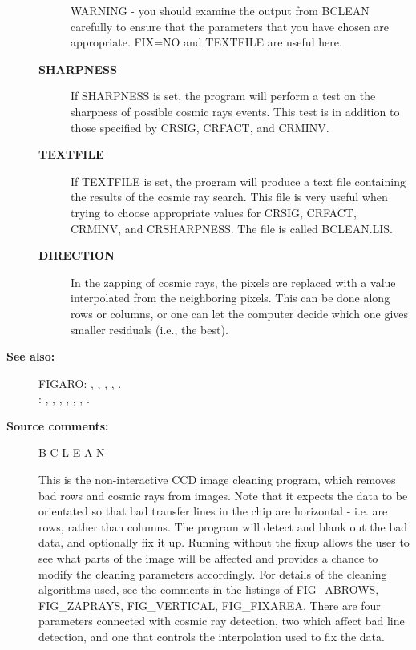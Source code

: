 \begin{description}
\begin{description}
 WARNING - you should examine the output from BCLEAN carefully
           to ensure that the parameters that you have chosen
           are appropriate. FIX=NO and TEXTFILE are useful here.
\item [\textbf{SHARPNESS}]
 If SHARPNESS is set, the program will perform a test on
 the sharpness of possible cosmic rays events. This test is in
 addition to those specified by CRSIG, CRFACT, and CRMINV.
\item [\textbf{TEXTFILE}]
 If TEXTFILE is set, the program will produce a text file
 containing the results of the cosmic ray search.  This file
 is very useful when trying to choose appropriate values for
 CRSIG, CRFACT, CRMINV, and CRSHARPNESS. The file is called
 BCLEAN.LIS.
\item [\textbf{DIRECTION}]
 In the zapping of cosmic rays, the pixels are replaced with
 a value interpolated from the neighboring pixels. This can
 be done along rows or columns, or one can let the computer
 decide which one gives smaller residuals (i.e., the best).
\end{description}

\item [\textbf{See also:}]
FIGARO: , , , , .\\
: , , , , , , .\\

\item [\textbf{Source comments:}]
\begin{terminalv}
 B C L E A N

 This is the non-interactive CCD image cleaning program,
 which removes bad rows and cosmic rays from images.  Note
 that it expects the data to be orientated so that bad
 transfer lines in the chip are horizontal - i.e. are rows,
 rather than columns.  The program will detect and blank out
 the bad data, and optionally fix it up.  Running without the
 fixup allows the user to see what parts of the image will be
 affected and provides a chance to modify the cleaning parameters
 accordingly.  For details of the cleaning algorithms used, see
 the comments in the listings of FIG_ABROWS, FIG_ZAPRAYS,
 FIG_VERTICAL, FIG_FIXAREA.  There are four parameters connected
 with cosmic ray detection, two which affect bad line detection,
 and one that controls the interpolation used to fix the data.


\end{terminalv}
\end{description}
